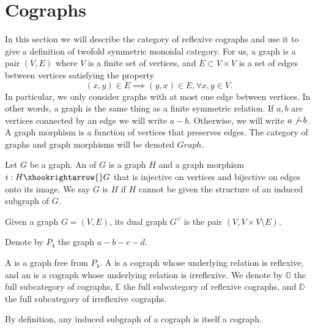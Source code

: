 \section{Cographs}\label{sec:cograph}
In this section we will describe the category of reflexive cographs and use it to give a definition of twofold symmetric monoidal category. For us, a graph is a pair $(V,E)$ where $V$ is a finite set of vertices, and $E\subset V\times V$ is a set of edges between vertices satisfying the property $$(x,y)\in E \implies (y,x)\in E, \forall x,y\in V.$$ In particular, we only consider graphs with at most one edge between vertices. In other words, a graph is the same thing as a finite symmetric relation. If $a,b$ are vertices connected by an edge we will write $a-b$. Otherwise, we will write $a\not - b$. A graph morphism is a function of vertices that preserves edges. The category of graphs and graph morphisms will be denoted $Graph.$

\begin{definition} Let $G$ be a graph. An  of $G$ is a graph $H$ and a graph morphism $i:H\xhookrightarrow{} G$ that is injective on vertices and bijective on edges onto its image. We say $G$ is  $H$ if $H$ cannot be given the structure of an induced subgraph of $G$.
\end{definition}

\begin{definition}
Given a graph $G=(V,E)$, its dual graph $G^{\vee}$ is the pair $(V,V\times V\setminus E)$. 
\end{definition}

\begin{definition}
Denote by $P_4$ the graph $a-b-c-d$.
\end{definition}

\begin{definition}
    A  is a graph free from $P_4$. A  is a cograph whose underlying relation is reflexive, and an  is a cograph whose underlying relation is irreflexive. We denote by $\mathbb{G}$ the full subcategory of cographs, $\mathbb{E}$ the full subcategory of reflexive cographs, and $\mathbb{D}$ the full subcategory of irreflexive cographs.
\end{definition}

\begin{remark}
By definition, any induced subgraph of a cograph is itself a cograph.
\end{remark}

